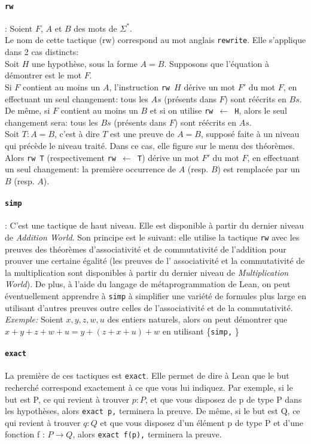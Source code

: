 \paragraph {\texttt{rw}}: Soient $F$, $A$ et $B$ des mots de $\Sigma^*$.\\
Le nom de cette tactique (rw) correspond au mot anglais \texttt{rewrite}. Elle s'applique dans 2 cas distincts:\\
Soit $H$ une hypothèse, sous la forme $A=B$. Supposons que l'équation à démontrer est le mot $F$. \\Si $F$ contient au moins un $A$, l'instruction \texttt{rw $H$} dérive un mot $F'$ du mot $F$, en effectuant un seul changement: tous les $As$ (présents dans $F$) sont réécrits en $Bs$. De même, si $F$ contient au moins un $B$ et si on utilise \texttt{rw $\leftarrow$ H}, alors le seul changement sera: tous les $Bs$ (présents dans $F$) sont réécrits en $As$.\\
Soit $T: A=B$, c'est à dire $T$ est une preuve de $A=B$, supposé faite à un niveau qui précède le niveau traité. Dans ce cas, elle figure sur le menu des théorèmes. Alors \texttt{rw T} (respectivement \texttt{rw $\leftarrow$ T}) dérive un mot $F'$ du mot $F$, en effectuant un seul changement: la première occurrence de $A$ (resp. $B$) est remplacée par un $B$ (resp. $A$). 

\paragraph {\texttt{simp}}: C'est une tactique de haut niveau. Elle est disponible à partir du dernier niveau de \textit{Addition World}. Son principe est le suivant: elle utilise la tactique \texttt{rw} avec les preuves des théorèmes d'associativité et de commutativité de l'addition pour prouver une certaine égalité (les preuves de l' associativité et la commutativité de la multiplication sont disponibles à partir du dernier niveau de \textit{Multiplication World}). De plus, à l'aide du langage de métaprogrammation de Lean, on peut éventuellement apprendre  à \texttt{simp} à simplifier une variété de formules plus large en utilisant d'autres preuves outre celles de l'associativité et de la commutativité.   \\
\textit{Exemple:} Soient $x,y,z,w,u$ des entiers naturels, alors on peut démontrer que $x+y+z+w+u=y+(z+x+u)+w$ en utilisant \big\{\texttt{simp,} \big\}



\paragraph{\texttt{exact}}
La première de ces tactiques est \texttt{exact}. Elle permet de dire à Lean que le but recherché correspond exactement à ce que vous lui indiquez. Par exemple, si le but est P, ce qui revient à trouver $p:P$, et que vous disposez de p de type P dans les hypothèses, alors \texttt{exact p,} terminera la preuve. De même, si le but est Q, ce qui revient à trouver $q:Q$ et que vous disposez d'un élément p de type P et d'une fonction f : $P \to Q$, alors \texttt{exact f(p),} terminera la preuve.\\
